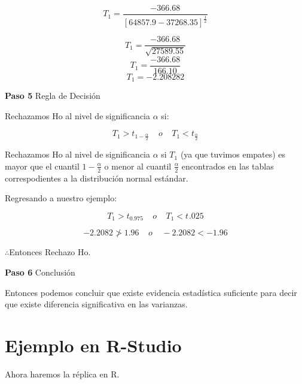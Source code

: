 \documentclass[a4paper,oneside,openany]{book}
\begin{document}
\[T_{1} = \frac{-366.68}{[64857.9-37268.35]^\frac{1}{2}}\]

\[T_{1} = \frac{-366.68}{\sqrt{27589.55}}\]
\[T_{1} = \frac{-366.68}{166.10}\] \[T_{1}= -2.208282\]

\textbf{Paso 5} Regla de Decisión

Rechazamos Ho al nivel de significancia \(\alpha\) si:

\[T_{1}>t_{1-\frac{\alpha}{2}} \ \ \ \ \  o  \ \ \ \ \ T_{1}<t_{\frac{\alpha}{2}}\]

Rechazamos Ho al nivel de significancia \(\alpha\) si \(T_{1}\) (ya que
tuvimos empates) es mayor que el cuantil \(1-\frac{\alpha}{2}\) o menor
al cuantil \(\frac{\alpha}{2}\) encontrados en las tablas
correspodientes a la distribución normal estándar.

Regresando a nuestro ejemplo:

\[T_{1}>t_{0.975} \ \ \ \ \  o \ \ \ \ \ T_{1}<t_{}.025\]

\[-2.2082 \ngtr 1.96  \ \ \ \ \   o  \ \ \ \ \  -2.2082 < -1.96\]

\(\therefore\)Entonces Rechazo Ho.

\textbf{Paso 6} Conclusión

Entonces podemos concluir que existe evidencia estadística suficiente
para decir que existe diferencia significativa en las varianzas.

\section{Ejemplo en R-Studio}\label{ejemplo-en-r-studio-7}

Ahora haremos la réplica en R.
\end{document}
